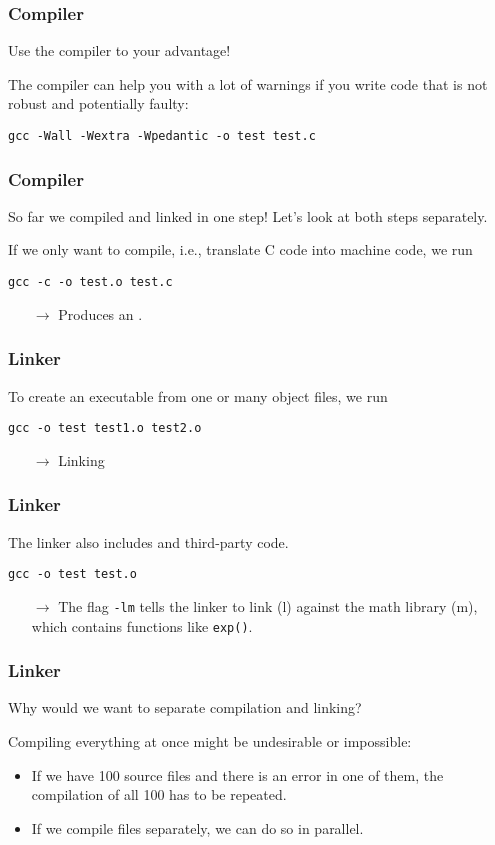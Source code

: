\documentclass[12pt,t]{beamer}
\let\emph\relax %
\newcommand{\conclude}[1]{%
  \begin{itemize}
    \item[$\rightarrow$]#1
  \end{itemize}
}
\newcommand{\cmd}[1]{\begin{center}\texttt{#1}\end{center}}
\begin{document}
  \begin{frame}[fragile]
    \frametitle{Compiler}

    Use the compiler to your advantage!

    The compiler can help you with a lot of warnings if you write code that is not robust and potentially faulty:
    \cmd{gcc -Wall -Wextra -Wpedantic -o test test.c}
  \end{frame}

  \begin{frame}[fragile]
    \frametitle{Compiler}
    So far we compiled and linked in one step! Let's look at both steps separately.

    If we only want to compile, i.e., translate C code into machine code, we run
    \cmd{gcc -c -o test.o test.c}

    \conclude{Produces an \emph{object file}.}
  \end{frame}

  \begin{frame}[fragile]
    \frametitle{Linker}

    To create an executable from one or many object files, we run
    \cmd{gcc -o test test1.o test2.o}

    \conclude{Linking}
  \end{frame}

  \begin{frame}[fragile]
    \frametitle{Linker}

    The linker also includes \emph{libraries} and third-party code.
    \cmd{gcc -o test test.o \emph{-lm}}

    \conclude{The flag \texttt{-lm} tells the linker to link (l) against the math library (m), which contains functions like \texttt{exp()}.}
  \end{frame}

  \begin{frame}[fragile]
    \frametitle{Linker}

    Why would we want to separate compilation and linking?

    Compiling everything at once might be undesirable or impossible:
    \begin{itemize}
      \item If we have 100 source files and there is an error in one of them, the compilation of all 100 has to be repeated.
      \item If we compile files separately, we can do so in parallel.
    \end{itemize}
  \end{frame}
\end{document}
